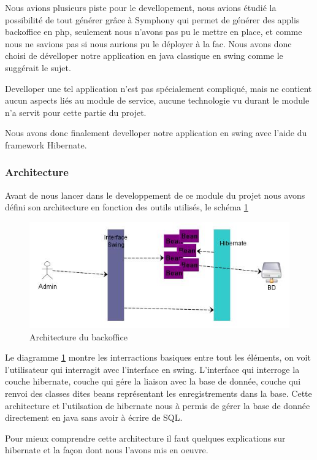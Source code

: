 \documentclass[11pt,a4paper]{article}
\begin{document}
Nous avions plusieurs piste pour le devellopement, nous avions étudié la possibilité de tout générer grâce à Symphony qui permet de générer des applis backoffice en php, seulement nous n'avons pas pu le mettre en place, et comme nous ne savions pas si nous aurions pu le déployer à la fac. Nous avons donc choisi de dévelloper notre application en java classique en swing comme le suggérait le sujet.

Develloper une tel application n'est pas spécialement compliqué, mais ne contient aucun aspects liés au module de service, aucune technologie vu durant le module n'a servit pour cette partie du projet.

Nous avons donc finalement develloper notre application en swing avec l'aide du framework Hibernate. 


\subsubsection{Architecture}

Avant de nous lancer dans le developpement de ce module du projet nous avons défini son architecture en fonction des outils utilisés, le schéma \ref{backoffice} 

\begin{figure}[h]
  		\centering
  		\includegraphics{backoffice.jpg}
  		\caption{Architecture du backoffice}
  		\label{backoffice}
\end{figure}

Le diagramme \ref{backoffice} montre les interractions basiques entre tout les éléments, on voit l'utilisateur qui interragit avec l'interface en swing. L'interface qui interroge la couche hibernate, couche qui gére la liaison avec la base de donnée, couche qui renvoi des classes dites beans représentant les enregistrements dans la base. Cette architecture et l'utilsation de hibernate nous à permis de gérer la base de donnée directement en java sans avoir à écrire de SQL. 

Pour mieux comprendre cette architecture il faut quelques explications sur hibernate et la façon dont nous l'avons mis en oeuvre.
\end{document}
